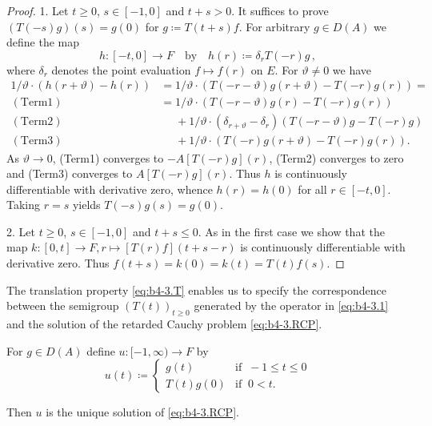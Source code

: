 \begin{proof}
1. Let $t \geq 0$, $s \in [-1,0]$ and $t+s  >  0$.
It suffices to prove $(T(-s)g)(s) = g(0)$ for $g  \coloneq  T(t+s)f$.
For arbitrary $g \in D(A)$ we define the map
\[
h : [-t,0] \to F \quad \text{by} \quad h(r) \coloneq  \delta_{r}T(-r)g\,,
\]
where $\delta_{r}$ denotes the point evaluation $f \mapsto f(r)$ on $E$.
For $\vartheta \neq 0$ we have
\begin{align*}
	1/\vartheta\cdot(h(r+\vartheta) - h(r)) & = 1/\vartheta\cdot(T(-r-\vartheta)g(r+\vartheta) - T(-r)g(r)) =\\
	(\mathrm{Term1})\quad  &= 1/\vartheta\cdot(T(-r-\vartheta)g(r) - T(-r)g(r)) \\
	(\mathrm{Term2})\quad  &\phantom{= }  + 1/\vartheta\cdot(\delta_{r+\vartheta} - \delta_{r})(T(-r-\vartheta)g - T(-r)g) \\
	(\mathrm{Term3})\quad &\phantom{= }  + 1/\vartheta\cdot(T(-r)g(r+\vartheta) - T(-r)g(r)).
\end{align*}
As $\vartheta \to 0$, (Term1) converges to $-A[T(-r)g](r)$, (Term2) converges to zero and (Term3) converges to $A[T(-r)g](r)$.
Thus $h$ is continuously differentiable with derivative zero, whence $h(r) = h(0)$ for all $r \in [-t,0]$.
Taking $r = s$ yields $T(-s)g(s) = g(0)$.

2. Let $t \geq 0$, $s \in [-1,0]$ and $t+s \leq 0$.
As in the first case we show that the map $k : [0,t] \to F , r \mapsto [T(r)f](t+s-r)$ is continuously differentiable with derivative zero.
Thus $f(t+s) = k(0) = k(t) = T(t)f(s)$.
\end{proof}
The translation property \eqref{eq:b4-3.T} enables us to specify the correspondence between the semigroup $(T(t))_{t\geq 0}$ generated by the operator in \eqref{eq:b4-3.1} and the solution of the retarded Cauchy problem \eqref{eq:b4-3.RCP}.
\begin{corollary}\label{cor:b4-3.2}
	For $g \in D(A)$ define $u : [-1,\infty) \to F$ by
	\[u(t)  \coloneq  \begin{cases}
		g(t) & \text{if } \ -1 \leq t \leq 0 \\
		T(t)g(0) & \text{if } \ 0 < t.
	\end{cases}\]
	
	Then $u$ is the unique solution of \eqref{eq:b4-3.RCP}.
\end{corollary}
